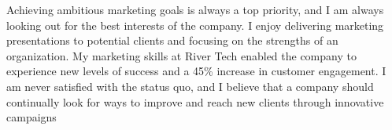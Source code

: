 



Achieving ambitious marketing goals is always a top priority, 
and I am always looking out for the best interests of the company. 
I enjoy delivering marketing presentations to potential clients and 
focusing on the strengths of an organization. My marketing skills at 
River Tech enabled the company to experience new levels of success 
and a 45\% increase in customer engagement. I am never satisfied 
with the status quo, and I believe that a company should 
continually look for ways to improve and reach new 
clients through innovative campaigns